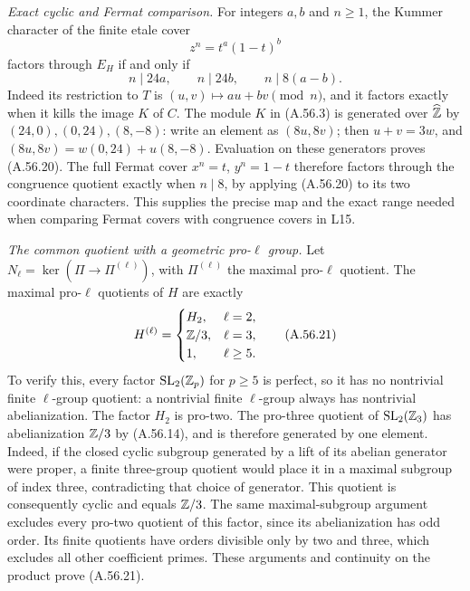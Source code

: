\noindent\emph{Exact cyclic and Fermat comparison.}
For integers $a,b$ and $n\ge1$, the Kummer character of the
finite etale cover
\[
                         z^n=t^a(1-t)^b
\]
factors through $E_H$ if and only if
\[
                   n\mid24a,\qquad n\mid24b,
                                  \qquad n\mid8(a-b).
\tag{A.56.20}
\]
Indeed its restriction to $T$ is $(u,v)\mapsto au+bv\pmod n$,
and it factors exactly when it kills the image $K$ of $C$.
The module $K$ in (A.56.3) is generated over $\widehat{\mathbb Z}$ by
$(24,0),(0,24),(8,-8)$: write an element as $(8u,8v)$;
then $u+v=3w$, and
$(8u,8v)=w(0,24)+u(8,-8)$.
Evaluation on these generators proves (A.56.20).
The full Fermat cover $x^n=t$, $y^n=1-t$ therefore factors
through the congruence quotient exactly when $n\mid8$,
by applying (A.56.20) to its two coordinate characters.
This supplies the precise map and the exact range needed
when comparing Fermat covers with congruence covers in L15.

\noindent\emph{The common quotient with a geometric pro-$\ell$ group.}
Let $N_\ell=\ker(\Pi\to\Pi^{(\ell)})$, with
$\Pi^{(\ell)}$ the maximal pro-$\ell$ quotient.
The maximal pro-$\ell$ quotients of $H$ are exactly
\[
 H^{(\ell)}=
 \begin{cases}
 H_2,&\ell=2,\\
 \mathbb Z/3,&\ell=3,\\
 1,&\ell\ge5.
 \end{cases}
\tag{A.56.21}
\]
To verify this, every factor $\operatorname{SL}_2(\mathbb Z_p)$
for $p\ge5$ is perfect, so it has no nontrivial finite
$\ell$-group quotient: a nontrivial finite $\ell$-group
always has nontrivial abelianization.  The factor $H_2$
is pro-two.  The pro-three quotient of
$\operatorname{SL}_2(\mathbb Z_3)$ has abelianization $\mathbb Z/3$
by (A.56.14), and is therefore generated by one element.
Indeed, if the closed cyclic subgroup generated by a lift
of its abelian generator were proper, a finite three-group
quotient would place it in a maximal subgroup of index
three, contradicting that choice of generator.
This quotient is consequently cyclic and equals $\mathbb Z/3$.
The same maximal-subgroup argument excludes every pro-two
quotient of this factor, since its abelianization has odd
order.  Its finite quotients have orders divisible only
by two and three, which excludes all other coefficient
primes.  These arguments and continuity on the product
prove (A.56.21).


